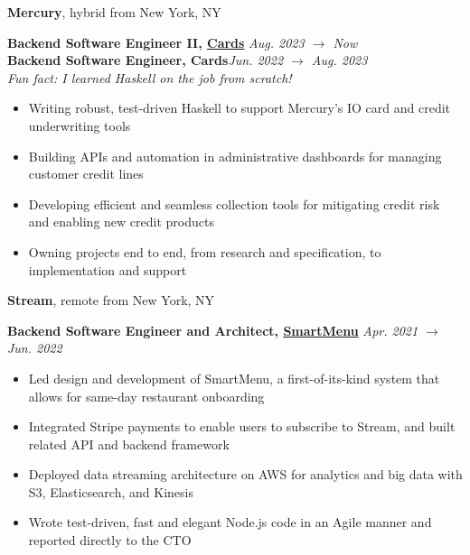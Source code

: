 \documentclass[10pt]{article}
\begin{document}
\begin{flushleft}
		\textbf{Mercury}, {\small hybrid from New York, NY}\\
		\begin{leftli}
			{\small \textbf{Backend Software Engineer II, \href{https://mercury.com/credit}{Cards}} \hfill \textit{\small Aug. 2023 $\rightarrow$ Now}}\\
			{\small \textbf{Backend Software Engineer, Cards}\hfill \textit{\small Jun. 2022 $\rightarrow$ Aug. 2023}}\\
			{\footnotesize \textit{Fun fact: I learned Haskell on the job from scratch!}}
			\begin{itemize}
				\item Writing robust, test-driven Haskell to support Mercury's IO card and credit underwriting tools
				\vspace{-2mm}
				\item Building APIs and automation in administrative dashboards for managing customer credit lines
				\vspace{-2mm}
				\item Developing efficient and seamless collection tools for mitigating credit risk and enabling new credit products
				\vspace{-2mm}
				\item Owning projects end to end, from research and specification, to implementation and support
			\end{itemize}
		\end{leftli}

		\vspace{-1.50mm}
		\textbf{Stream}, {\small remote from New York, NY}\\
		\begin{leftli}
			{\small \textbf{Backend Software Engineer and Architect, \href{https://www.streamorders.com/product-features/full-control}{SmartMenu}} \hfill \textit{\small Apr. 2021 $\rightarrow$ Jun. 2022}}\\
			\begin{itemize}
				\item Led design and development of SmartMenu, a first-of-its-kind system that allows for same-day restaurant onboarding
				\vspace{-2mm}
				\item Integrated Stripe payments to enable users to subscribe to Stream, and built related API and backend framework
				\vspace{-2mm}
				\item Deployed data streaming architecture on AWS for analytics and big data with S3, Elasticsearch, and Kinesis
				\vspace{-2mm}
				\item Wrote test-driven, fast and elegant Node.js code in an Agile manner and reported directly to the CTO
			\end{itemize}
		\end{leftli}


\end{flushleft}
\end{document}
